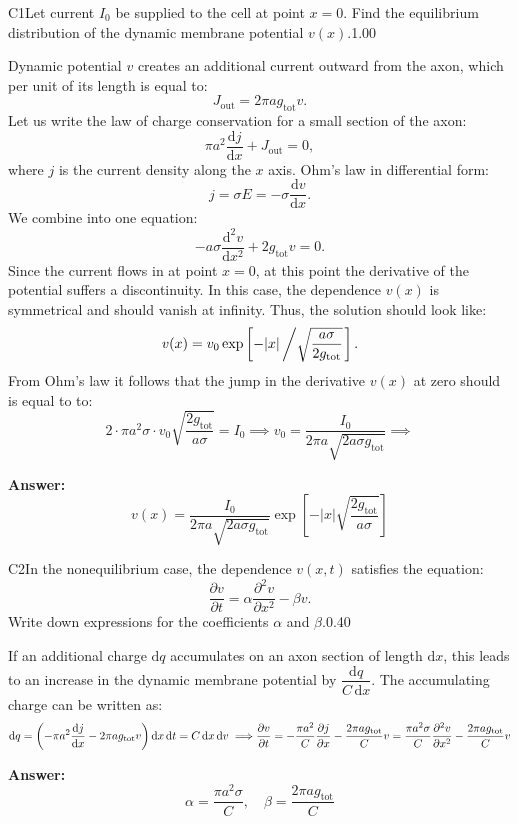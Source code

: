 \documentclass[11pt,a4paper]{article}
\begin{document}
\begin{solcard}{C1}{Let current $I_0$ be supplied to the cell at point $x=0$. Find the equilibrium distribution of the dynamic membrane potential $v(x)$.}{1.00}

Dynamic potential $v$ creates an additional current outward from the axon, which per unit of its length is equal to: \[J_\mathrm{out}=2\pi ag_\mathrm{tot}v.\] Let us write the law of charge conservation for a small section of the axon: \[\pi a^2\dfrac{\mathrm d j}{\mathrm dx}+J_\mathrm{out}=0,\] where $j$ is the current density along the $x$ axis. Ohm's law in differential form:\[j=\sigma E=-\sigma\dfrac{\mathrm d v}{\mathrm dx}.\]We combine into one equation:\[-a\sigma \dfrac{\mathrm d^2v}{\mathrm dx^2}+2g_\mathrm{tot}v=0.\]Since the current flows in at point $x=0$, at this point the derivative of the potential suffers a discontinuity. In this case, the dependence $v(x)$ is symmetrical and should vanish at infinity. Thus, the solution should look like:\[v(x)=v_0\exp\left[-|x|\left/\sqrt{\dfrac{a\sigma}{2g_\mathrm{tot}}}\right.\right].\]From Ohm’s law it follows that the jump in the derivative $v(x)$ at zero should is equal to to:\[2\cdot \pi a^2\sigma \cdot v_0\sqrt{\dfrac{2g_\mathrm{tot}}{a\sigma}}=I_0\implies v_0=\dfrac{I_0}{2\pi a\sqrt{2a\sigma g_\mathrm{tot}}}\implies\]

\par\smallskip\noindent\textbf{Answer:} \[v(x)=\dfrac{I_0}{2\pi a\sqrt{2a\sigma g_\mathrm{tot}}}\exp\left[-|x|\left.\sqrt{\dfrac{2g_\mathrm{tot}}{a\sigma}}\right.\right]\]
\end{solcard}

\begin{solcard}{C2}{In the nonequilibrium case, the dependence $v(x,t)$ satisfies the equation:\[\dfrac{\partial v}{\partial t}=\alpha\dfrac{\partial^2v}{\partial x^2}-\beta v.\]Write down expressions for the coefficients $\alpha$ and $\beta$.}{0.40}

If an additional charge $\mathrm dq$ accumulates on an axon section of length $\mathrm dx$, this leads to an increase in the dynamic membrane potential by $\dfrac{\mathrm dq}{C\,\mathrm dx}$. The accumulating charge can be written as: \[\mathrm dq=\left(-\pi a^2\dfrac{\mathrm dj}{\mathrm dx}-2\pi ag_\mathrm{tot}v\right)\mathrm dx\,\mathrm dt=C\,\mathrm dx\,\mathrm dv\implies\\\dfrac{\partial v}{\partial t}=-\dfrac{\pi a^2}{C}\dfrac{\partial j}{\partial x}-\dfrac{2\pi ag_\mathrm{tot}}{C}v=\dfrac{\pi a^2\sigma}{C}\dfrac{\partial^2v}{\partial x^2}-\dfrac{2\pi ag_\mathrm{tot}}{C}v\]

\par\smallskip\noindent\textbf{Answer:} \[\alpha=\dfrac{\pi a^2\sigma}{C},\quad\beta=\dfrac{2\pi ag_\mathrm{tot}}{C}\]
\end{solcard}
\end{document}
